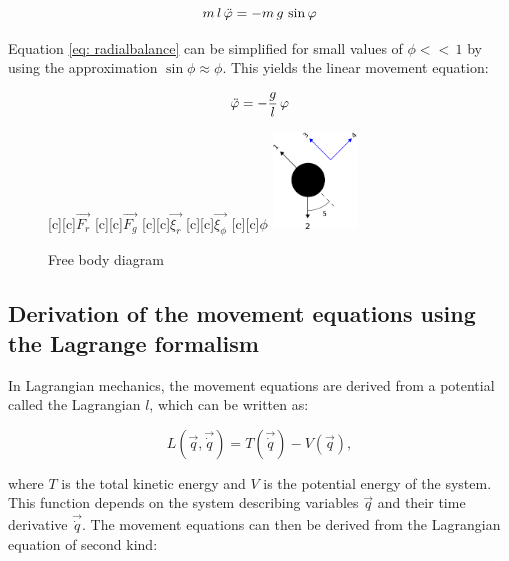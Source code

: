 \documentclass[12pt,bibstyle=none,pagenumberinfooter]{ifmdocument}
\begin{document}
\begin{equation}
\label{eq: tangentialbalance}
    m\, l \, \Ddot{\phi} = -m\, g \,\sin{\phi}
\end{equation}

Equation \ref{eq: radialbalance} can be simplified for small values of $\phi <<\, 1$ by using the approximation $\sin{\phi} \approx \phi $. This yields the linear movement equation:

\begin{equation}

    \Ddot{\phi} = -\frac{g}{l}\,\phi
\end{equation}





\begin{figure}[h]
  \begin{center}
    {
        \psfragscanon
      [c][c]{$\vec{F_r}$}
      [c][c]{$\vec{F_g}$}
      [c][c]{$\vec{\xi_r}$}
      [c][c]{$\vec{\xi_{\phi}}$}
      [c][c]{$\phi$}
      \includegraphics[width=0.2\textwidth]{Figures/Zeichnung2.eps}}
  \end{center}
  \caption{Free body diagram}
  \label{fig:free body}
\end{figure}

\subsection{Derivation of the movement equations using the Lagrange formalism}
\label{sec: lagrange}

In Lagrangian mechanics, the movement equations are derived from a potential called the Lagrangian $l$, which can be written as:

\begin{equation}
\label{eq: Lagrangian}
    L(\Vec{q}, \Vec{\Dot{q}}) = T(\Vec{\Dot{q}}) - V(\Vec{q}),
\end{equation}

where $T$ is the total kinetic energy and $V$ is the potential energy of the system. This function depends on the system describing variables $\Vec{q}$ and their time derivative $\Vec{\Dot{q}}$. The movement equations can then be derived from the Lagrangian equation of second kind:
\end{document}
